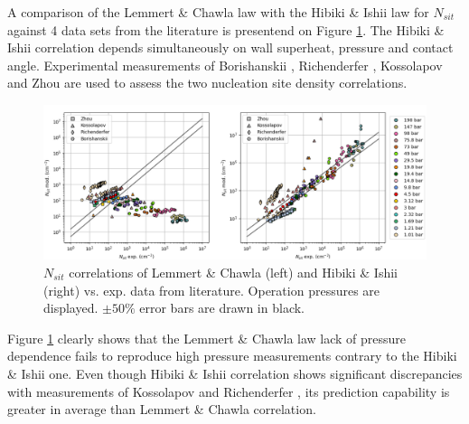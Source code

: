A comparison of the {Lemmert} \& {Chawla} law\cite{lemmert_influence_1977} with  the {Hibiki} \& {Ishii}\cite{hibiki_active_2003} law for $N_{sit}$ against 4 data sets from the literature is presentend on Figure \ref{fig:nsit}. The {Hibiki} \& {Ishii} correlation depends simultaneously on wall superheat, pressure and contact angle.  Experimental measurements of {Borishanskii} \etal\cite{borishanskii_heat_1969}, {Richenderfer} \etal\cite{richenderfer_investigation_2018}, {Kossolapov} \etal\cite{kossolapov_experimental_2021} and {Zhou} \etal\cite{zhou_experimental_2020-1} are used to assess the two nucleation site density correlations.
%
\begin{figure}[h!]
\centering
\includegraphics[scale=0.45]{img/DEBORA/nsit.png}
\caption{$N_{sit}$ correlations of {Lemmert} \& {Chawla} (left) and {Hibiki} \& {Ishii} (right) vs. exp. data from literature. Operation pressures are displayed. $\pm 50\%$ error bars are drawn in black.}
\label{fig:nsit}
\end{figure}
%

Figure \ref{fig:nsit} clearly shows that the {Lemmert} \& {Chawla} law lack of pressure dependence fails to reproduce high pressure measurements contrary to the {Hibiki} \& {Ishii} one. Even though {Hibiki} \& {Ishii} correlation shows significant discrepancies with measurements of {Kossolapov} \etal and {Richenderfer} \etal, its prediction capability is greater in average than {Lemmert} \& {Chawla} correlation.

